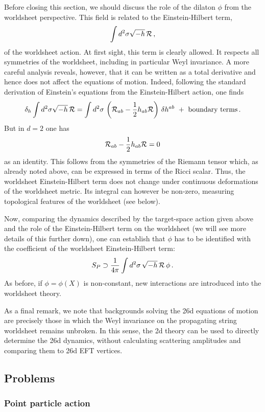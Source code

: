 \documentclass[12pt]{article}
\newcommand{\be}{\begin{equation}}
\newcommand{\ee}{\end{equation}}
\numberwithin{equation}{section}
\begin{document}
Before closing this section, we should discuss the role of the dilaton $\phi$ from the worldsheet perspective. This field is related to the Einstein-Hilbert term,
\be
\int d^2\sigma \sqrt{-h}\,{\cal R}\,,
\ee
of the worldsheet action. At first sight, this term is clearly allowed. It  respects all symmetries of the worldsheet, including in particular Weyl invariance. A more careful analysis reveals, however, that it can be written as a total derivative and hence does not affect the equations of motion. Indeed, following the standard derivation of Einstein's equations from the Einstein-Hilbert action, one finds
\be
\delta_h \int d^2\sigma \sqrt{-h}\,{\cal R} = \int d^2\sigma\,\left({\cal R}_{ab}-\frac{1}{2}h_{ab}{\cal R}\right)\,\delta h^{ab}\,\,+\,\,\mbox{boundary terms}\,.
\ee
But in $d=2$ one has 
\be
{\cal R}_{ab}-\frac{1}{2}h_{ab}{\cal R}=0
\ee
as an identity. This follows from the symmetries of the Riemann tensor which, as already noted above, can be expressed in terms of the Ricci scalar. Thus, the worldsheet Einstein-Hilbert term does not change under continuous deformations of the worldsheet metric. Its integral can however be non-zero, measuring topological features of the worldsheet (see below). 

Now, comparing the dynamics described by the target-space action given above and the role of the Einstein-Hilbert term on the worldsheet (we will see more details of this further down), one can establish that $\phi$ has to be identified with the coefficient of the worldsheet Einstein-Hilbert term:
\be
S_P\supset \frac{1}{4\pi}\int d^2\sigma\,\sqrt{-h}\,{\cal R}\,\phi\,.
\ee
As before, if $\phi=\phi(X)$ is non-constant, new interactions are introduced into the worldsheet theory. 

As a final remark, we note that backgrounds solving the 26d equations of motion are precisely those in which the Weyl invariance on the propagating string worldsheet remains unbroken. In this sense, the 2d theory can be used to directly determine the 26d dynamics, without calculating scattering amplitudes and comparing them to 26d EFT vertices. 





\subsection{Problems}

\subsubsection{Point particle action}
\end{document}
